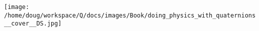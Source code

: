 \texttt{[image: /home/doug/workspace/Q/docs/images/Book/doing\_physics\_with\_quaternions\_\_cover\_\_DS.jpg]}
\thispagestyle{empty}
